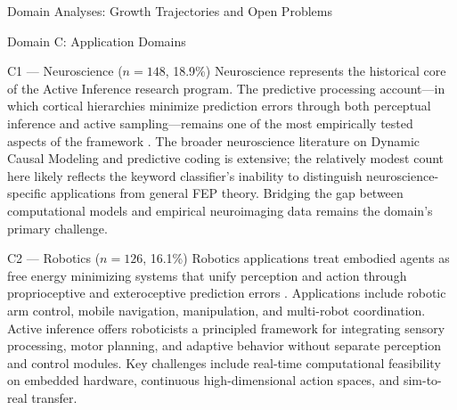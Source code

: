 \documentclass[
  ignorenonframetext,
]{beamer}
\begin{document}
\begin{frame}{Domain Analyses: Growth Trajectories and Open Problems
\label{sec:subfield_analyses}}
\begin{block}{Domain C: Application Domains}
\protect{}\label{domain-c-application-domains}
\begin{block}{C1 --- Neuroscience (\(n = 148\), 18.9\%)}
\protect{}\label{c1-neuroscience-n-148-18.9}
Neuroscience represents the historical core of the Active Inference
research program. The predictive processing account---in which cortical
hierarchies minimize prediction errors through both perceptual inference
and active sampling---remains one of the most empirically tested aspects
of the framework \citep{friston2010free, clark2013whatever}. The broader
neuroscience literature on Dynamic Causal Modeling and predictive coding
is extensive; the relatively modest count here likely reflects the
keyword classifier's inability to distinguish neuroscience-specific
applications from general FEP theory. Bridging the gap between
computational models and empirical neuroimaging data remains the
domain's primary challenge.
\end{block}

\begin{block}{C2 --- Robotics (\(n = 126\), 16.1\%)}
\protect{}\label{c2-robotics-n-126-16.1}
Robotics applications treat embodied agents as free energy minimizing
systems that unify perception and action through proprioceptive and
exteroceptive prediction errors \citep{lanillos2021active}. Applications
include robotic arm control, mobile navigation, manipulation, and
multi-robot coordination. Active inference offers roboticists a
principled framework for integrating sensory processing, motor planning,
and adaptive behavior without separate perception and control modules.
Key challenges include real-time computational feasibility on embedded
hardware, continuous high-dimensional action spaces, and sim-to-real
transfer.
\end{block}


\end{block}
\end{frame}
\end{document}
